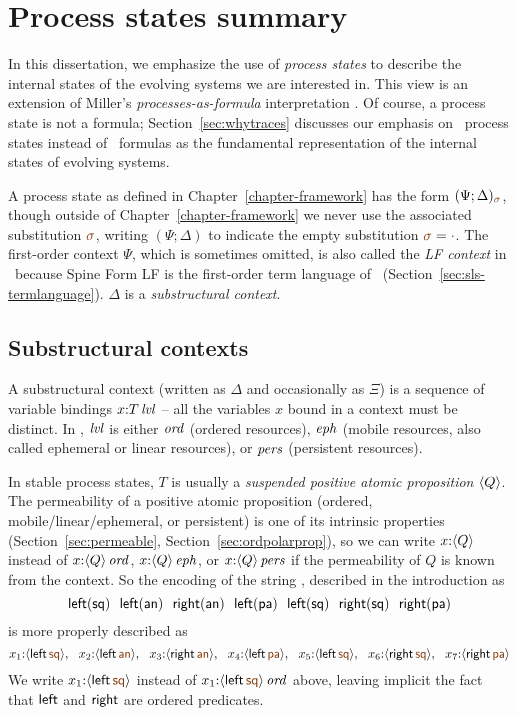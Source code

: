 \chapter{Process states summary}
\label{appendix-procsum}

In this dissertation, we emphasize the use of {\it process states} to
describe the internal states of the evolving systems we are interested in.
This view is an extension of Miller's {\it processes-as-formula}
interpretation \cite{miller92pi,deng12relating}. Of course, a process
state is not a formula; Section~\ref{sec:whytraces} discusses our
emphasis on \sls~process states instead of \sls~formulas as the fundamental
representation of the internal states of evolving systems.

A process state as defined in Chapter~\ref{chapter-framework} has the
form $(\Psi; \Delta)_{\lf{\sigma}}$, though outside of
Chapter~\ref{chapter-framework} we never use the associated
substitution $\lf{\sigma}$, writing $(\Psi; \Delta)$ to indicate the
empty substitution $\lf{\sigma} = \lf{\cdot}$. The first-order context
$\Psi$, which is sometimes omitted, is also called the {\it LF
  context} in \sls~because Spine Form LF is the first-order term
language of \sls~(Section~\ref{sec:sls-termlanguage}). $\Delta$ is a
{\it substructural context}.

\section{Substructural contexts}

A substructural context (written as $\Delta$ and occasionally as $\Xi$)
is a sequence of variable bindings $x{:}{T}\,{{\it lvl}}$ -- all the
variables $x$ bound in a context must be distinct. In \sls, ${\it lvl}$ is
either ${\it ord}$ (ordered resources), ${\it eph}$ (mobile resources, also
called ephemeral or linear resources), or ${\it pers}$ (persistent
resources). 

In stable process states, $T$ is usually a {\it suspended positive
  atomic proposition} $\langle {Q} \rangle$.  The permeability of a positive
atomic proposition (ordered, mobile/linear/ephemeral, or persistent)
is one of its intrinsic properties (Section~\ref{sec:permeable},
Section~\ref{sec:ordpolarprop}), so we can write $x{:}\langle {Q} \rangle$
instead of $x{:}{\langle {Q} \rangle}\,{{\it ord}}$, $x{:}{\langle {Q} \rangle}\,{{\it eph}}$, or
$x{:}{\langle {Q} \rangle}\,{{\it pers}}$ if the permeability of $Q$ is known from the
context. So the encoding of the string \obj{\mbox{{\sf [
      \textless~\textgreater~( [ ] )}}}, described in the introduction
as
\[
{\sf 
  left(sq) ~~
  left(an) ~~
  right(an) ~~
  left(pa) ~~
  left(sq) ~~
  right(sq) ~~
  right(pa)}
\]
is more properly described as
{\small \[ 
{
  x_1{:}\susp{\sf left\,\lf{sq}}, ~~
  x_2{:}\susp{\sf left\,\lf{an}}, ~~
  x_3{:}\susp{\sf right\,\lf{an}}, ~~
  x_4{:}\susp{\sf left\,\lf{pa}}, ~~
  x_5{:}\susp{\sf left\,\lf{sq}}, ~~
  x_6{:}\susp{\sf right\,\lf{sq}}, ~~
  x_7{:}\susp{\sf right\,\lf{pa}}
}
\]}We write $x_1{:}{\susp{\sf left\,\lf{sq}}}$ instead of
$x_1{:}\istrue{\susp{\sf left\,\lf{sq}}}$ above, leaving implicit the fact that 
${\sf left}$ and ${\sf right}$ are ordered predicates.


